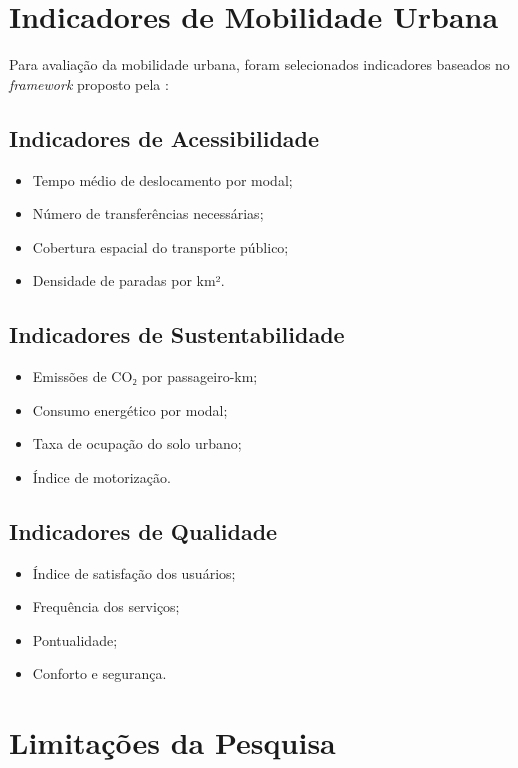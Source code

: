 \section{Indicadores de Mobilidade Urbana}

Para avaliação da mobilidade urbana, foram selecionados indicadores baseados no \textit{framework} proposto pela  \cite{antp2018}:

\subsection{Indicadores de Acessibilidade}

\begin{itemize}
    \item Tempo médio de deslocamento por modal;
    \item Número de transferências necessárias;
    \item Cobertura espacial do transporte público;
    \item Densidade de paradas por km².
\end{itemize}

\subsection{Indicadores de Sustentabilidade}

\begin{itemize}
    \item Emissões de CO₂ por passageiro-km;
    \item Consumo energético por modal;
    \item Taxa de ocupação do solo urbano;
    \item Índice de motorização.
\end{itemize}

\subsection{Indicadores de Qualidade}

\begin{itemize}
    \item Índice de satisfação dos usuários;
    \item Frequência dos serviços;
    \item Pontualidade;
    \item Conforto e segurança.
\end{itemize}

\section{Limitações da Pesquisa}


